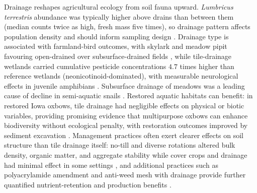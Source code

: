 Drainage reshapes agricultural ecology from soil fauna upward. \textit{Lumbricus
terrestris} abundance was typically higher above drains than between them
(median counts twice as high, fresh mass five times), so drainage pattern
affects population density and should inform sampling design
\parencite{Nuutinen2001,Nuutinen2011}. Drainage type is associated with
farmland-bird outcomes, with skylark and meadow pipit favouring open-drained
over subsurface-drained fields \parencite{Marja2013}, while tile-drainage
wetlands carried cumulative pesticide concentrations $4.7$ times higher than
reference wetlands (neonicotinoid-dominated), with measurable neurological
effects in juvenile amphibians \parencite{Campbell2023}. Subsurface drainage
of meadows was a leading cause of decline in semi-aquatic snails
\parencite{Dreyfuss2018}. Restored aquatic habitats can benefit: in restored
Iowa oxbows, tile drainage had negligible effects on physical or biotic
variables, providing promising evidence that multipurpose oxbows can enhance
biodiversity without ecological penalty, with restoration outcomes improved by
sediment excavation \parencite{Leberg2024,Winikoff2020,Harris2018}. Management
practices often exert clearer effects on soil structure than tile drainage
itself: no-till and diverse rotations altered bulk density, organic matter, and
aggregate stability while cover crops and drainage had minimal effect in some
settings \parencite{Saha2024,Hermawan1996,Sherbine2023}, and additional
practices such as polyacrylamide amendment and anti-weed mesh with drainage
provide further quantified nutrient-retention and production benefits
\parencite{Jiang2010,GiménezValero2024,GiménezValero2025}.